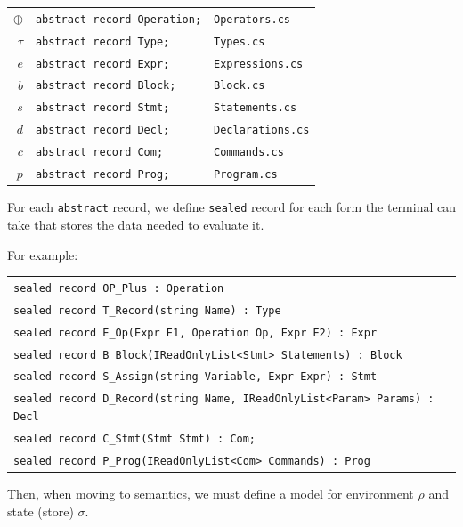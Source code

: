 \documentclass[11pt,a4paper]{article}
\begin{document}
\begin{center}
\begin{tabular}{rll}
	$\oplus$ & \lstinline|abstract record Operation;| &  \texttt{Operators.cs}\\
	$\tau$   & \lstinline|abstract record Type;| & \texttt{Types.cs} \\
	$e$      & \lstinline|abstract record Expr;| & \texttt{Expressions.cs} \\
	$b$      & \lstinline|abstract record Block;| & \texttt{Block.cs} \\
	$s$      & \lstinline|abstract record Stmt;| & \texttt{Statements.cs} \\
	$d$      & \lstinline|abstract record Decl;| & \texttt{Declarations.cs} \\
	$c$      & \lstinline|abstract record Com;| & \texttt{Commands.cs} \\
	$p$      & \lstinline|abstract record Prog;| & \texttt{Program.cs} \\
\end{tabular}
\end{center}

For each \lstinline|abstract| record, we define \lstinline|sealed| record for each form the terminal can take that stores the data needed to evaluate it.

For example:
\begin{center}
\begin{tabular}{l}
	\lstinline|sealed record OP_Plus : Operation|\\
	\lstinline|sealed record T_Record(string Name) : Type|\\
	\lstinline|sealed record E_Op(Expr E1, Operation Op, Expr E2) : Expr| \\
	\lstinline|sealed record B_Block(IReadOnlyList<Stmt> Statements) : Block| \\
	\lstinline|sealed record S_Assign(string Variable, Expr Expr) : Stmt| \\
	\lstinline|sealed record D_Record(string Name, IReadOnlyList<Param> Params) : Decl| \\
	\lstinline|sealed record C_Stmt(Stmt Stmt) : Com;|\\
	\lstinline|sealed record P_Prog(IReadOnlyList<Com> Commands) : Prog|
\end{tabular}
\end{center}

Then, when moving to semantics, we must define a model for environment $\rho$ and state (store) $\sigma$.
\end{document}
